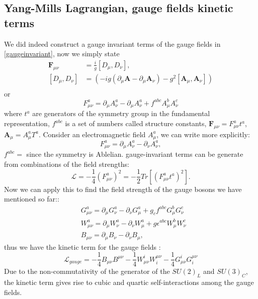 \documentclass{report}
\numberwithin{equation}{section}
\begin{document}
\subsection{Yang-Mills Lagrangian, gauge fields kinetic terms\label{12}}
We did indeed construct a gauge invariant terms of the gauge fields in \ref{gaugeinvariant}, now we simply state
\begin{align}
\textbf{F}_{\mu\nu}&=\frac{i}{g}\left[D_\mu,D_\nu\right],\\
[D_\mu,D_\nu]&=(-ig (\partial_\mu\textbf{A}-\partial_\mu\textbf{A}_\nu)-g^2[\textbf{A}_\mu,\textbf{A}_\nu])\\
\end{align}
or
\begin{equation}
    F_{\mu\nu}^a=\partial_\mu A_\nu^a-\partial_\mu A^a_\nu +f^{abc} A_\mu^b A_\nu^c
\end{equation}
where $t^a$ are generators of the 
symmetry group in the fundamental representation, $f^{abc}$ is a set of numbers called structure constants, $\textbf{F}_{\mu\nu}=F_{\mu\nu}^a t^a$, $\textbf{A}_\mu=A_\mu^aT^a$. Consider an electromagnetic field $A_\mu^a$, we can write more explicitly:
\begin{equation}
F_{\mu\nu}^a=\partial_\mu A_\nu^a -\partial_\nu A^a_\nu ,
\end{equation}
$f^{abc}=$ since the symmetry is Ablelian.
gauge-invariant terms can be generate from combinations of the field strengths:
\begin{equation}
\mathcal{L}=-\frac{1}{4}(F_{\mu\nu}^a)^2= -\frac{1}{2} Tr \left[\left(F_{\mu\nu}^a t^a\right)^2\right].
\end{equation}
Now we can apply this to find the field strength  of the gauge bosons we have mentioned so far::
\begin{align}
&G_{\mu\nu}^a=\partial_\mu G_\nu^a -\partial_\nu G^a_\mu +g_c f^{abc} G_\mu^b G_\nu^c\\
&W_{\mu\nu}^a=\partial_\mu W_\nu^a -\partial_\nu W^a_\mu +g \epsilon^{abc} W_\mu^b W_\nu^c \label{13}\\
&B_{\mu\nu}=\partial_\mu B_\nu -\partial_\nu B_\mu \label{14} ,
\end{align}
thus we have the kinetic term for the gauge fields :
\begin{equation}
\mathcal{L}_{gauge}= -\frac{1}{4}B_{\mu\nu}B^{\mu\nu}
-\frac{1}{4}W_{\mu\nu}^iW^{\mu\nu}_i-\frac{1}{4}G_{\mu\nu}^iG^{\mu\nu}_i
\end{equation}
Due to the non-commutativity of the generator of the $SU(2)_L$ and $SU(3)_C$, the kinetic term gives rise to cubic and
quartic self-interactions among the gauge fields.
\end{document}
